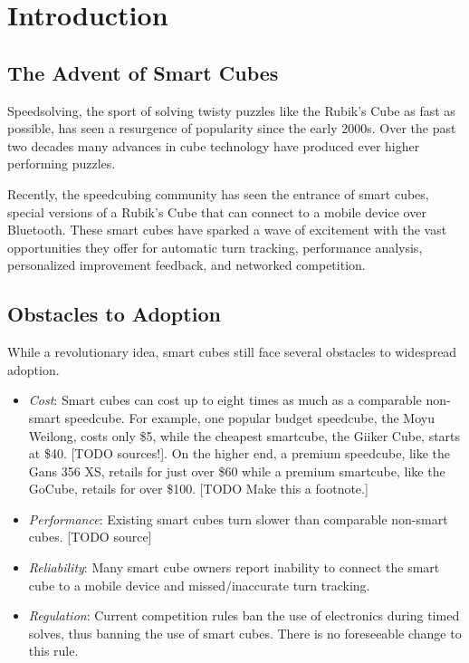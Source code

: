 
\chapter{Introduction} %

\label{Chapter1} %



\section{The Advent of Smart Cubes}
Speedsolving, the sport of solving twisty puzzles like the Rubik’s Cube as fast as possible, has seen a resurgence of popularity since the early 2000s. %
Over the past two decades many advances in cube technology have produced ever higher performing puzzles. 

Recently, the speedcubing community has seen the entrance of smart cubes, special versions of a Rubik’s Cube that can connect to a mobile device over Bluetooth. 
These smart cubes have sparked a wave of excitement with the vast opportunities they offer for automatic turn tracking, performance analysis, personalized improvement feedback, and networked competition.

\section{Obstacles to Adoption}
While a revolutionary idea, smart cubes still face several obstacles to widespread adoption. 

\begin{itemize}
    \item \emph{Cost}: Smart cubes can cost up to eight times as much as a comparable non-smart speedcube. For example, one popular budget speedcube, the Moyu Weilong, costs only \$5, while the cheapest smartcube, the Giiker Cube, starts at \$40. [TODO sources!]. On the higher end, a premium speedcube, like the Gans 356 XS, retails for just over \$60 while a premium smartcube, like the GoCube, retails for over \$100. [TODO Make this a footnote.]
    \item \emph{Performance}: Existing smart cubes turn slower than comparable non-smart cubes. [TODO source]
    \item \emph{Reliability}: Many smart cube owners report inability to connect the smart cube to a mobile device and missed/inaccurate turn tracking.
    \item \emph{Regulation}: Current competition rules ban the use of electronics during timed solves, thus banning the use of smart cubes. There is no foreseeable change to this rule. 
\end{itemize}

